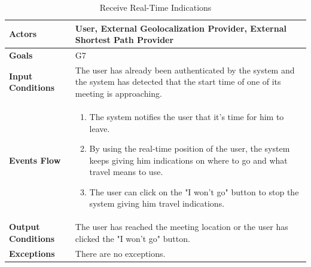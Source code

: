 \begin{table}[H]
	\centering
	\def\arraystretch{1.5}
	\begin{tabular}{|p{7cm}|p{7cm}|}
		\hline
		\textbf{Actors}            & User, External Geolocalization Provider, External Shortest Path Provider		    \\ \hline
		\textbf{Goals}             & G7           \\ \hline
		\textbf{Input Conditions}  & The user has already been authenticated by the system and the system has detected that the start time of one of its meeting is approaching.           \\ \hline
		\textbf{Events Flow}       & 
			\begin{enumerate}[topsep=0pt, leftmargin=*]
				\item The system notifies the user that it's time for him to leave.
				\item By using the real-time position of the user, the system keeps giving him indications on where to go and what travel means to use.
				\item The user can click on the "I won't go" button to stop the system giving him travel indications.
			\end{enumerate}	        \\ \hline
		\textbf{Output Conditions} & The user has reached the meeting location or the user has clicked the "I won't go" button.           \\ \hline
		\textbf{Exceptions}        & There are no exceptions.           \\ \hline
	\end{tabular}
	\caption{Receive Real-Time Indications}
\end{table}

